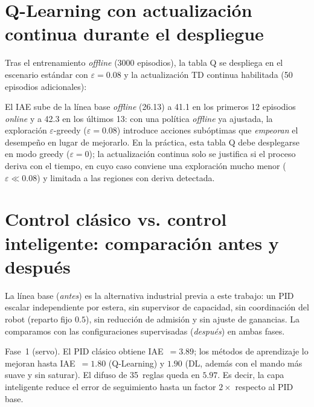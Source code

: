 \section{Q-Learning con actualización continua durante el despliegue}
\label{sec:ql_online}

Tras el entrenamiento \emph{offline} (3000 episodios), la tabla Q se despliega en el escenario estándar con $\varepsilon=0.08$ y la actualización TD continua habilitada (50 episodios adicionales):




El IAE sube de la línea base \emph{offline} (26.13) a 41.1 en los primeros 12 episodios \emph{online} y a 42.3 en los últimos 13: con una política \emph{offline} ya ajustada, la exploración $\varepsilon$-greedy ($\varepsilon=0.08$) introduce acciones subóptimas que \emph{empeoran} el desempeño en lugar de mejorarlo. En la práctica, esta tabla Q debe desplegarse en modo greedy ($\varepsilon=0$); la actualización continua solo se justifica si el proceso deriva con el tiempo, en cuyo caso conviene una exploración mucho menor ($\varepsilon\!\ll\!0.08$) y limitada a las regiones con deriva detectada.

\section{Control clásico vs. control inteligente: comparación antes y después}

La línea base (\emph{antes}) es la alternativa industrial previa a este trabajo: un PID escalar independiente por estera, sin supervisor de capacidad, sin coordinación del robot (reparto fijo $0.5$), sin reducción de admisión y sin ajuste de ganancias. La comparamos con las configuraciones supervisadas (\emph{después}) en ambas fases.

Fase~1 (servo). El PID clásico obtiene IAE~$=3.89$; los métodos de aprendizaje lo mejoran hasta IAE~$=1.80$ (Q-Learning) y $1.90$ (DL, además con el mando más suave y sin saturar). El difuso de 35~reglas queda en $5.97$. Es decir, la capa inteligente reduce el error de seguimiento hasta un factor $2\times$ respecto al PID base.

